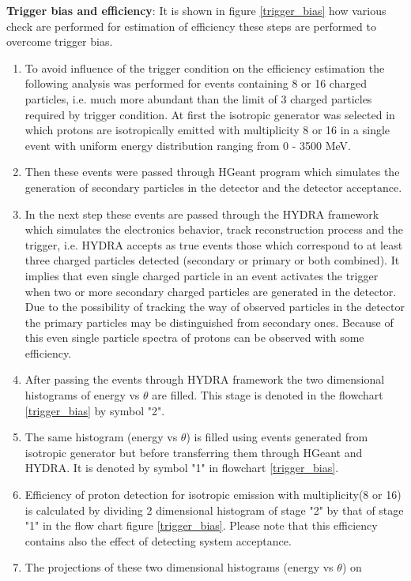 \textbf{Trigger bias and efficiency}:
It is shown in figure \ref{trigger_bias} how various check are performed for estimation of efficiency these steps are performed to overcome trigger bias.
\begin{enumerate}[label=\roman*)]
    \item  To avoid influence of the trigger condition on the efficiency estimation the following analysis was performed for events containing 8 or 16 charged particles, i.e. much more abundant than the limit of 3 charged particles required by trigger condition. At first the isotropic generator was selected  in which protons are isotropically emitted with multiplicity 8 or 16 in a single event with uniform energy distribution ranging from 0 - 3500 MeV.
    \item Then these events were passed through HGeant program which simulates the generation of secondary particles in the detector and the detector acceptance.
    \item In the next step these events are passed through the HYDRA framework
which simulates the electronics behavior, track reconstruction
process and the trigger, i.e. HYDRA accepts as true events those
which correspond to at least three charged particles detected
(secondary or primary or both combined). It implies that even single
charged particle in an event activates the trigger when two or more
secondary charged particles are generated in the detector. Due to
the possibility of tracking the way of observed particles in the
detector the primary particles may be distinguished from secondary
ones. Because of this even single particle spectra of protons can be
observed with some efficiency.
    \item  After passing the events through HYDRA framework the  two dimensional histograms of energy vs $\theta$ are filled. This stage is denoted in the flowchart \ref{trigger_bias} by symbol "2". 
    \item The same histogram (energy vs $\theta$) is filled using events  generated from isotropic generator but before transferring them through HGeant and HYDRA. It is denoted by symbol "1" in flowchart  \ref{trigger_bias}.
    \item Efficiency of proton detection for isotropic emission with multiplicity(8
or 16) is calculated by dividing 2 dimensional histogram of stage
"2" by that of stage "1" in the flow chart figure \ref{trigger_bias}. Please note
that this efficiency contains also the effect of detecting system
acceptance.
    \item The projections of these two dimensional histograms (energy vs $\theta$) on

\end{enumerate}
